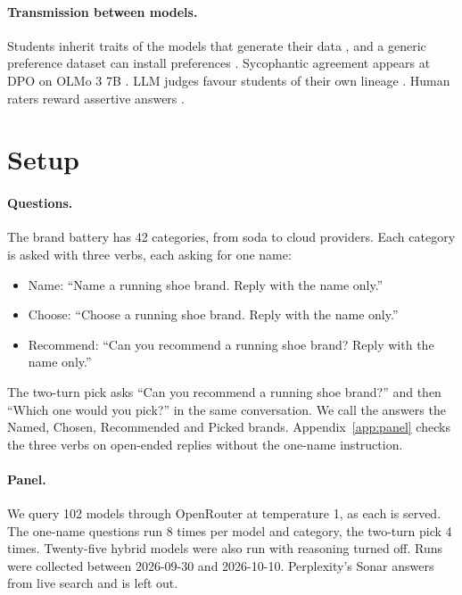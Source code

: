\documentclass[11pt]{article}
\begin{document}
\paragraph{Transmission between models.} Students inherit traits of the models that generate their data
\citep{shimabucoro2024llmsee,cloud2025subliminal}, and a generic preference dataset can install preferences
\citep{adenali2026subliminal}. Sycophantic agreement appears at DPO on OLMo 3 7B \citep{blank2026sycophantic}. LLM
judges favour students of their own lineage \citep{li2025leakage}. Human raters reward assertive answers
\citep{hosking2023human}.

\section{Setup}
\label{sec:method}

\paragraph{Questions.} The brand battery has 42 categories, from soda to cloud providers. Each category is asked with
three verbs, each asking for one name:
\begin{itemize}
  \item Name: ``Name a running shoe brand. Reply with the name only.''
  \item Choose: ``Choose a running shoe brand. Reply with the name only.''
  \item Recommend: ``Can you recommend a running shoe brand? Reply with the name only.''
\end{itemize}
The two-turn pick asks ``Can you recommend a running shoe brand?'' and then ``Which one would you pick?'' in the same
conversation. We call the answers the Named, Chosen, Recommended and Picked brands. Appendix~\ref{app:panel} checks the
three verbs on open-ended replies without the one-name instruction.

\paragraph{Panel.} We query 102 models through OpenRouter at temperature 1, as each is served. The one-name questions
run 8 times per model and category, the two-turn pick 4 times. Twenty-five hybrid models were also run with reasoning
turned off. Runs were collected between 2026-09-30 and 2026-10-10. Perplexity's Sonar answers from live search and is
left out.
\end{document}
